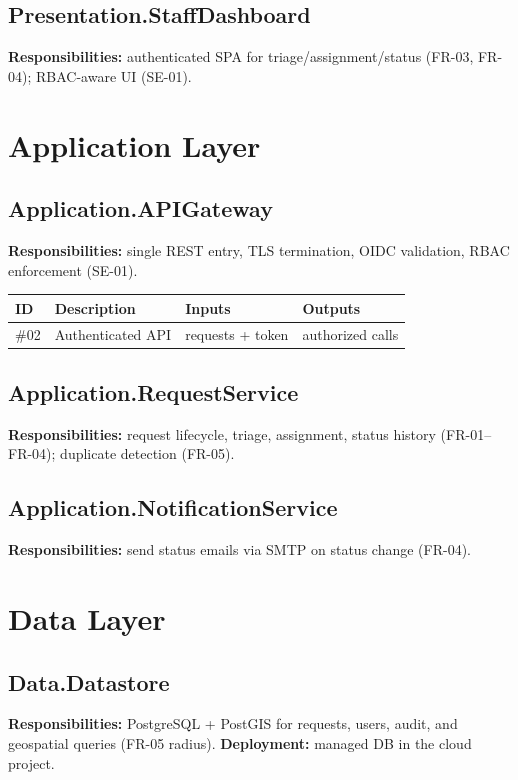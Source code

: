 \documentclass[11pt,letterpaper]{article}
\begin{document}
\subsection{Presentation.StaffDashboard}
\textbf{Responsibilities:} authenticated SPA for triage/assignment/status (FR-03,
FR-04); RBAC-aware UI (SE-01).

\section{Application Layer}
\subsection{Application.APIGateway}
\textbf{Responsibilities:} single REST entry, TLS termination, OIDC validation, RBAC
enforcement (SE-01).
\begin{table}[H]\begin{center}\begin{tabular}{ | p{1cm} | p{6cm} | p{2.6cm} | p{2.6cm} |}\hline
ID & Description & Inputs & Outputs \\ \hline
\#02 & Authenticated API & requests + token & authorized calls \\ \hline
\end{tabular}\end{center}\end{table}
\subsection{Application.RequestService}
\textbf{Responsibilities:} request lifecycle, triage, assignment, status history
(FR-01--FR-04); duplicate detection (FR-05).
\subsection{Application.NotificationService}
\textbf{Responsibilities:} send status emails via SMTP on status change (FR-04).

\section{Data Layer}
\subsection{Data.Datastore}
\textbf{Responsibilities:} PostgreSQL + PostGIS for requests, users, audit, and
geospatial queries (FR-05 radius). \textbf{Deployment:} managed DB in the cloud
project.
\end{document}

